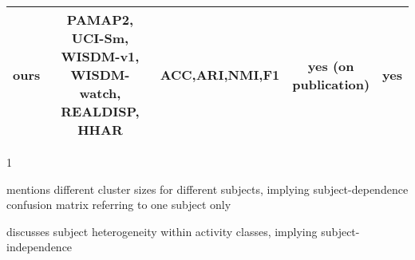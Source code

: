 \documentclass[wcp]{jmlr}
\begin{document}
\begin{table*}[h]
\begin{threeparttable}
{\begin{tabular}{|c|c|c|c|c|}
         \hline
         ours      &  \makecell{PAMAP2, UCI-Sm, \\ WISDM-v1, WISDM-watch, \\ REALDISP, HHAR} &   ACC,ARI,NMI,F1        &   \makecell{yes (on \\ publication)} & yes\\
         \hline
    \end{tabular}}
    \end{threeparttable}
    \begin{tablenotes}
        \footnotesize
        \item[1]{\cite{altun2010comparative}}
        \item{\cite{malekzadeh2018protecting}}
        \item mentions different cluster sizes for different subjects, implying subject-dependence
        \itemdisplays confusion matrix referring to one subject only
        \item discusses subject heterogeneity within activity classes, implying subject-independence
    \end{tablenotes}\end{table*}
\end{document}
